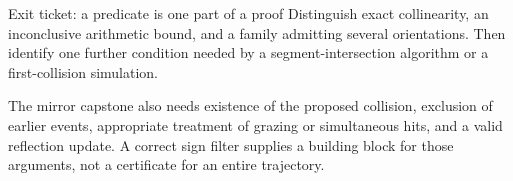 \begin{question}{Exit ticket: a predicate is one part of a proof}
Distinguish exact collinearity, an inconclusive arithmetic bound, and a
family admitting several orientations. Then identify one further condition
needed by a segment-intersection algorithm or a first-collision simulation.
\end{question}

The mirror capstone also needs existence of the proposed collision,
exclusion of earlier events, appropriate treatment of grazing or simultaneous
hits, and a valid reflection update. A correct sign filter supplies a
building block for those arguments, not a certificate for an entire trajectory.


